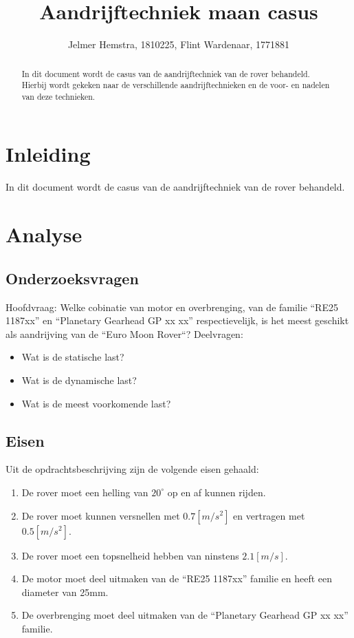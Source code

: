 \documentclass{article}
\title{Aandrijftechniek maan casus}
\author{Jelmer Hemstra, 1810225, Flint Wardenaar, 1771881}
\begin{document}
\maketitle

\begin{abstract}
    In dit document wordt de casus van de aandrijftechniek van de rover behandeld. Hierbij wordt gekeken naar de verschillende aandrijftechnieken en de voor- en nadelen van deze technieken.
\end{abstract}



\section{Inleiding}
    In dit document wordt de casus van de aandrijftechniek van de rover behandeld. 


\section{Analyse}
    \subsection{Onderzoeksvragen}
        Hoofdvraag: \newline
        Welke cobinatie van motor en overbrenging, 
        van de familie ``RE25 1187xx'' en ``Planetary Gearhead GP xx xx'' respectievelijk, 
        is het meest geschikt als aandrijving van de ``Euro Moon Rover``?
        \newline \newline
        Deelvragen: 
        \begin{itemize}
            \item Wat is de statische last?
            \item Wat is de dynamische last?
            \item Wat is de meest voorkomende last?
        \end{itemize}

    \subsection{Eisen}
        Uit de opdrachtsbeschrijving zijn de volgende eisen gehaald:
        \begin{enumerate}
            \item De rover moet een helling van $20^{\circ}$ op en af kunnen rijden.
            \item De rover moet kunnen versnellen met $0.7[m/s^2]$ en vertragen met $0.5[m/s^2]$.
            \item De rover moet een topsnelheid hebben van ninstens $2.1[m/s]$.
            \item De motor moet deel uitmaken van de ``RE25 1187xx'' familie en heeft een diameter van 25mm.
            \item De overbrenging moet deel uitmaken van de ``Planetary Gearhead GP xx xx'' familie.
        \end{enumerate}
    
\end{document}
